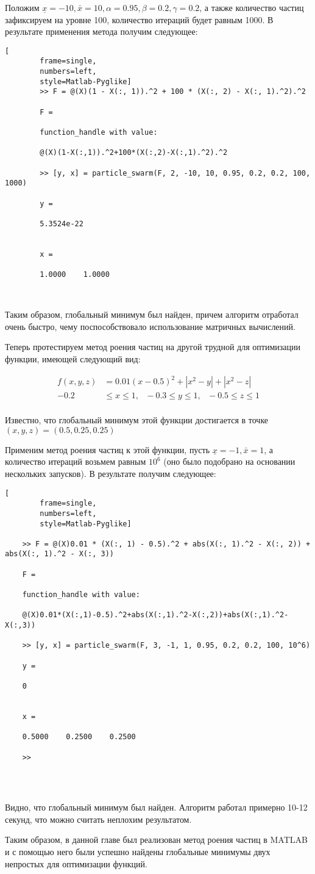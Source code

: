 \documentclass[../main.tex]{subfiles}
\begin{document}
	Положим $\underline{x} = -10,  \bar{x} = 10, \alpha = 0.95, \beta = 0.2, \gamma=0.2$, а также количество частиц зафиксируем на уровне 100, количество итераций будет равным 1000. В результате применения метода получим следующее:
	
	\begin{lstlisting}[
		frame=single,
		numbers=left,
		style=Matlab-Pyglike]
		>> F = @(X)(1 - X(:, 1)).^2 + 100 * (X(:, 2) - X(:, 1).^2).^2
		
		F =
		
		function_handle with value:
		
		@(X)(1-X(:,1)).^2+100*(X(:,2)-X(:,1).^2).^2
		
		>> [y, x] = particle_swarm(F, 2, -10, 10, 0.95, 0.2, 0.2, 100, 1000)
		
		y =
		
		5.3524e-22
		
		
		x =
		
		1.0000    1.0000
		
		
	\end{lstlisting}
	
	Таким образом, глобальный минимум был найден, причем алгоритм отработал очень быстро, чему поспособствовало использование матричных вычислений.
	
	Теперь протестируем метод роения частиц на другой трудной для оптимизации функции, имеющей следующий вид:
	
	\[\begin{aligned}
		f(x, y, z) &= 0.01(x-0.5)^2 + |x^2-y| + |x^2 - z| \\
		-0.2 &\leqslant x \leqslant 1, \text{ } -0.3 \leqslant y \leqslant 1, \text{ }
		 -0.5 \leqslant z \leqslant 1 \\
	\end{aligned}\]

	Известно, что глобальный минимум этой функции достигается в точке $(x, y, z) = (0.5, 0.25, 0.25)$
	
	Применим метод роения частиц к этой функции, пусть $\underline{x} = -1,  \bar{x} = 1$, а количество итераций возьмем равным $10^6$ (оно было подобрано на основании нескольких запусков). В результате получим следующее:
	
	\begin{lstlisting}[
		frame=single,
		numbers=left,
		style=Matlab-Pyglike]
	
	>> F = @(X)0.01 * (X(:, 1) - 0.5).^2 + abs(X(:, 1).^2 - X(:, 2)) + abs(X(:, 1).^2 - X(:, 3))
	
	F =
	
	function_handle with value:
	
	@(X)0.01*(X(:,1)-0.5).^2+abs(X(:,1).^2-X(:,2))+abs(X(:,1).^2-X(:,3))
	
	>> [y, x] = particle_swarm(F, 3, -1, 1, 0.95, 0.2, 0.2, 100, 10^6)
	
	y =
	
	0
	
	
	x =
	
	0.5000    0.2500    0.2500
	
	>> 
	
		
		
	\end{lstlisting}

	Видно, что глобальный минимум был найден. Алгоритм работал примерно 10-12 секунд, что можно считать неплохим результатом.
	
	Таким образом, в данной главе был реализован метод роения частиц в MATLAB и с помощью него были успешно найдены глобальные минимумы двух непростых для оптимизации функций.
\end{document}
